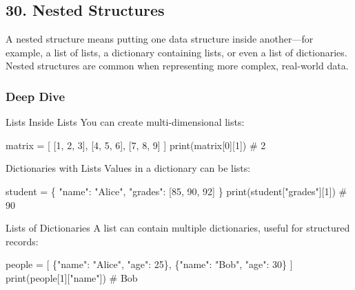 \documentclass[
  letterpaper,
  DIV=11,
  numbers=noendperiod]{scrreprt}
\newenvironment{Shaded}{\begin{snugshade}}{\end{snugshade}}
\newcommand{\BuiltInTok}[1]{\textcolor[rgb]{0.00,0.23,0.31}{#1}}
\newcommand{\CommentTok}[1]{\textcolor[rgb]{0.37,0.37,0.37}{#1}}
\newcommand{\DecValTok}[1]{\textcolor[rgb]{0.68,0.00,0.00}{#1}}
\newcommand{\NormalTok}[1]{\textcolor[rgb]{0.00,0.23,0.31}{#1}}
\newcommand{\OperatorTok}[1]{\textcolor[rgb]{0.37,0.37,0.37}{#1}}
\newcommand{\StringTok}[1]{\textcolor[rgb]{0.13,0.47,0.30}{#1}}
\begin{document}
\subsection{30. Nested Structures}\label{nested-structures}

A nested structure means putting one data structure inside another---for
example, a list of lists, a dictionary containing lists, or even a list
of dictionaries. Nested structures are common when representing more
complex, real-world data.

\subsubsection{Deep Dive}\label{deep-dive-29}

Lists Inside Lists You can create multi-dimensional lists:

\begin{Shaded}
\begin{Highlighting}[]
\NormalTok{matrix }\OperatorTok{=}\NormalTok{ [}
\NormalTok{    [}\DecValTok{1}\NormalTok{, }\DecValTok{2}\NormalTok{, }\DecValTok{3}\NormalTok{],}
\NormalTok{    [}\DecValTok{4}\NormalTok{, }\DecValTok{5}\NormalTok{, }\DecValTok{6}\NormalTok{],}
\NormalTok{    [}\DecValTok{7}\NormalTok{, }\DecValTok{8}\NormalTok{, }\DecValTok{9}\NormalTok{]}
\NormalTok{]}
\BuiltInTok{print}\NormalTok{(matrix[}\DecValTok{0}\NormalTok{][}\DecValTok{1}\NormalTok{])   }\CommentTok{\# 2}
\end{Highlighting}
\end{Shaded}

Dictionaries with Lists Values in a dictionary can be lists:

\begin{Shaded}
\begin{Highlighting}[]
\NormalTok{student }\OperatorTok{=}\NormalTok{ \{}
    \StringTok{"name"}\NormalTok{: }\StringTok{"Alice"}\NormalTok{,}
    \StringTok{"grades"}\NormalTok{: [}\DecValTok{85}\NormalTok{, }\DecValTok{90}\NormalTok{, }\DecValTok{92}\NormalTok{]}
\NormalTok{\}}
\BuiltInTok{print}\NormalTok{(student[}\StringTok{"grades"}\NormalTok{][}\DecValTok{1}\NormalTok{])   }\CommentTok{\# 90}
\end{Highlighting}
\end{Shaded}

Lists of Dictionaries A list can contain multiple dictionaries, useful
for structured records:

\begin{Shaded}
\begin{Highlighting}[]
\NormalTok{people }\OperatorTok{=}\NormalTok{ [}
\NormalTok{    \{}\StringTok{"name"}\NormalTok{: }\StringTok{"Alice"}\NormalTok{, }\StringTok{"age"}\NormalTok{: }\DecValTok{25}\NormalTok{\},}
\NormalTok{    \{}\StringTok{"name"}\NormalTok{: }\StringTok{"Bob"}\NormalTok{, }\StringTok{"age"}\NormalTok{: }\DecValTok{30}\NormalTok{\}}
\NormalTok{]}
\BuiltInTok{print}\NormalTok{(people[}\DecValTok{1}\NormalTok{][}\StringTok{"name"}\NormalTok{])   }\CommentTok{\# Bob}
\end{Highlighting}
\end{Shaded}
\end{document}
